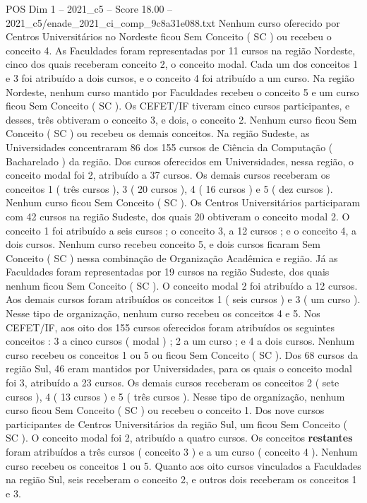 \begin{textsample}{POS Dim 1 – 2021\_c5 – Score 18.00 – 2021\_c5/enade\_2021\_ci\_comp\_9c8a31e088.txt}
Nenhum curso oferecido por Centros Universitários no Nordeste ficou Sem Conceito ( SC ) ou recebeu o conceito 4.
As Faculdades foram representadas por 11 cursos na região Nordeste, cinco dos quais receberam conceito 2, o conceito modal.
Cada um dos conceitos 1 e 3 foi atribuído a dois cursos, e o conceito 4 foi atribuído a um curso.
Na região Nordeste, nenhum curso mantido por Faculdades recebeu o conceito 5 e um curso ficou Sem Conceito ( SC ).
Os CEFET/IF tiveram cinco cursos participantes, e desses, três obtiveram o conceito 3, e dois, o conceito 2.
Nenhum curso ficou Sem Conceito ( SC ) ou recebeu os demais conceitos.
Na região Sudeste, as Universidades concentraram 86 dos 155 cursos de Ciência da Computação ( Bacharelado ) da região.
Dos cursos oferecidos em Universidades, nessa região, o conceito modal foi 2, atribuído a 37 cursos.
Os demais cursos receberam os conceitos 1 ( três cursos ), 3 ( 20 cursos ), 4 ( 16 cursos ) e 5 ( dez cursos ).
Nenhum curso ficou Sem Conceito ( SC ).
Os Centros Universitários participaram com 42 cursos na região Sudeste, dos quais 20 obtiveram o conceito modal 2.
O conceito 1 foi atribuído a seis cursos ; o conceito 3, a 12 cursos ; e o conceito 4, a dois cursos.
Nenhum curso recebeu conceito 5, e dois cursos ficaram Sem Conceito ( SC ) nessa combinação de Organização Acadêmica e região.
Já as Faculdades foram representadas por 19 cursos na região Sudeste, dos quais nenhum ficou Sem Conceito ( SC ).
O conceito modal 2 foi atribuído a 12 cursos.
Aos demais cursos foram atribuídos os conceitos 1 ( seis cursos ) e 3 ( um curso ).
Nesse tipo de organização, nenhum curso recebeu os conceitos 4 e 5.
Nos CEFET/IF, aos oito dos 155 cursos oferecidos foram atribuídos os seguintes conceitos : 3 a cinco cursos ( modal ) ; 2 a um curso ; e 4 a dois cursos.
Nenhum curso recebeu os conceitos 1 ou 5 ou ficou Sem Conceito ( SC ).
Dos 68 cursos da região Sul, 46 eram mantidos por Universidades, para os quais o conceito modal foi 3, atribuído a 23 cursos.
Os demais cursos receberam os conceitos 2 ( sete cursos ), 4 ( 13 cursos ) e 5 ( três cursos ).
Nesse tipo de organização, nenhum curso ficou Sem Conceito ( SC ) ou recebeu o conceito 1.
Dos nove cursos participantes de Centros Universitários da região Sul, um ficou Sem Conceito ( SC ).
O conceito modal foi 2, atribuído a quatro cursos.
Os conceitos \textbf{restantes} foram atribuídos a três cursos ( conceito 3 ) e a um curso ( conceito 4 ).
Nenhum curso recebeu os conceitos 1 ou 5.
Quanto aos oito cursos vinculados a Faculdades na região Sul, seis receberam o conceito 2, e outros dois receberam os conceitos 1 e 3.

\end{textsample}
